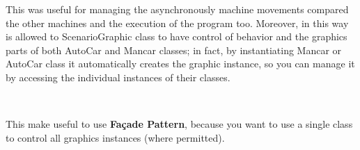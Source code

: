 \documentclass[a4paper,titlepage]{article}
\begin{document}
This was useful for managing the asynchronously machine movements compared the other machines and the execution of the program too. Moreover, in this way is allowed to ScenarioGraphic class to have control of behavior and the graphics parts of both AutoCar and Mancar classes; in fact, by instantiating Mancar or AutoCar class it automatically creates the graphic instance, so you can manage it by accessing the individual instances of their classes.

~

This make useful to use \textbf{Façade Pattern}, because you want to use a single class to control all graphics instances (where permitted).
\end{document}
